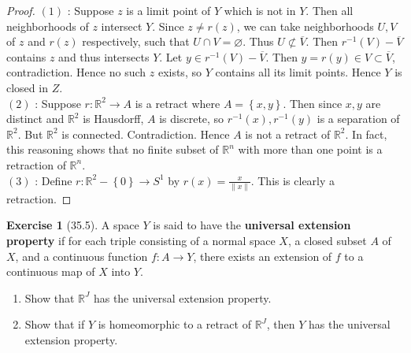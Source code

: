\documentclass[reqno]{amsart}
\theoremstyle{plain}%
\theoremstyle{definition}
\newtheorem{exercise}[theorem]{Exercise}
\theoremstyle{remark}
\begin{document}
\begin{proof}
    $(1)$ : Suppose $z$ is a limit point of $Y$ which is not in $Y$.
    Then all neighborhoods of $z$ intersect $Y$. 
    Since $z \neq r(z)$, we can take neighborhoods $U,V$ of
    $z$ and $r(z)$ respectively, such that
    $U \cap V = \varnothing$. Thus $U \not \subset \overline{V}$. Then
    $r^{-1}(V)- \overline{V}$ contains $z$ and thus intersects $Y$.
    Let $y \in r^{-1}(V) - \overline{V}$. Then
    $y = r(y) \in V \subset \overline{V}$, contradiction.
    Hence no such $z$ exists, so $Y$ contains all its limit points. Hence
    $Y$ is closed in $Z$.\\
    \linebreak
    $(2)$ : Suppose $r  \colon \mathbb{R}^2 \to A$ is a retract where
    $A = \left\{ x,y \right\} $. Then
    since $x,y$ are distinct and $\mathbb{R}^2$ is Hausdorff, $A$ is discrete,
    so
    $r^{-1}(x), r^{-1}(y)$ is a separation of $\mathbb{R}^2$. But
    $\mathbb{R}^2$ is connected. Contradiction. Hence $A$ is not a retract of
    $\mathbb{R}^2$. In fact, this reasoning shows that no finite subset
    of $\mathbb{R}^n$ with more than one point is a retraction of
    $\mathbb{R}^n$.\\
    \linebreak
    $(3)$ : Define $r  \colon \mathbb{R}^2 - \left\{ 0 \right\} \to S^{1}$ by
    $r(x) = \frac{x}{\|x\|}$. This is clearly a retraction.
\end{proof}

\begin{exercise}[35.5]
    A space $Y$ is said to have the \textbf{universal extension property} if
    for each triple consisting of a normal space $X$, a closed subset
    $A$ of $X$, and a continuous function $f  \colon A \to Y$, there
    exists an extension of $f$ to a continuous map of $X$ into
    $Y$.
    \begin{enumerate}
        \item Show that $\mathbb{R}^{J}$ has the universal extension
            property.
        \item Show that if $Y$ is homeomorphic to a retract of
            $\mathbb{R}^{J}$, then $Y$ has the universal extension
            property.
    \end{enumerate}
\end{exercise}
\end{document}
